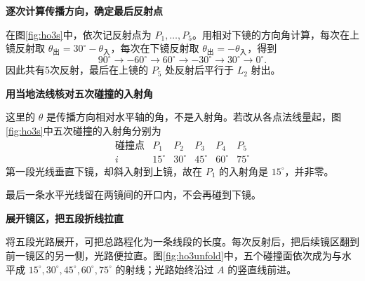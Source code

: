 \begin{solution}\textbf{逐次计算传播方向，确定最后反射点}\par\nobreak
在图\ref{fig:ho3s}中，依次记反射点为 $P_1,\ldots,P_5$。用相对下镜的方向角计算，每次在上镜反射取 $\theta_{\text{出}}=30^\circ-\theta_{\text{入}}$，每次在下镜反射取 $\theta_{\text{出}}=-\theta_{\text{入}}$，得到
\[
90^\circ\to-60^\circ\to60^\circ\to-30^\circ\to30^\circ\to0^\circ.
\]
因此共有5次反射，最后在上镜的 $P_5$ 处反射后平行于 $L_2$ 射出。


\par\medskip{}\noindent\textbf{用当地法线核对五次碰撞的入射角}\par\nobreak
这里的 $\theta$ 是传播方向相对水平轴的角，不是入射角。若改从各点法线量起，图\ref{fig:ho3s}中五次碰撞的入射角分别为
\[
\begin{array}{c|ccccc}
\text{碰撞点}&P_1&P_2&P_3&P_4&P_5\\\hline
i&15^\circ&30^\circ&45^\circ&60^\circ&75^\circ
\end{array}
\]
第一段光线垂直下镜，却斜入射到上镜，故在 $P_1$ 的入射角是 $15^\circ$，并非零。

最后一条水平光线留在两镜间的开口内，不会再碰到下镜。



\par\medskip{}\noindent\textbf{展开镜区，把五段折线拉直}\par\nobreak
将五段光路展开，可把总路程化为一条线段的长度。每次反射后，把后续镜区翻到前一镜区的另一侧，光路便拉直。图\ref{fig:ho3unfold}中，五个碰撞面依次成为与水平成 $15^\circ,30^\circ,45^\circ,60^\circ,75^\circ$ 的射线；光路始终沿过 $A$ 的竖直线前进。


\end{solution}
